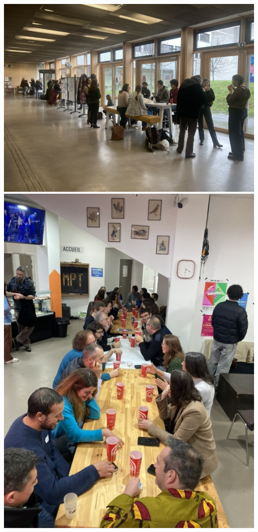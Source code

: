 \documentclass[xcolor=dvipsnames, 10pt, french, american]{beamer}
\begin{document}
\begin{frame}
    \begin{center}
        \includegraphics[height=0.6\textheight]{figures/acqua3}
        \includegraphics[height=0.6\textheight]{figures/acqua4}
    \end{center}
\end{frame}
\end{document}
